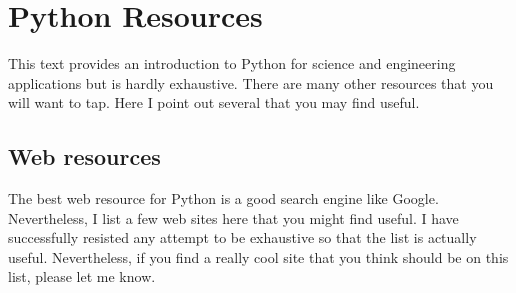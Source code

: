 \documentclass[letterpaper,10pt,english]{sphinxmanual}
\begin{document}
\chapter{Python Resources}
\label{apdx3/apdx3_resources:apdx3}\label{apdx3/apdx3_resources:python-resources}
This text provides an introduction to Python for science and engineering applications but is hardly exhaustive.  There are many other resources that you will want to tap.  Here I point out several that you may find useful.


\section{Web resources}
\label{apdx3/apdx3_resources:web-resources}
The best web resource for Python is a good search engine like Google.  Nevertheless, I list a few web sites here that you might find useful.  I have successfully resisted any attempt to be exhaustive so that the list is actually useful.  Nevertheless, if you find a really cool site that you think should be on this list, please let me know.
\end{document}
